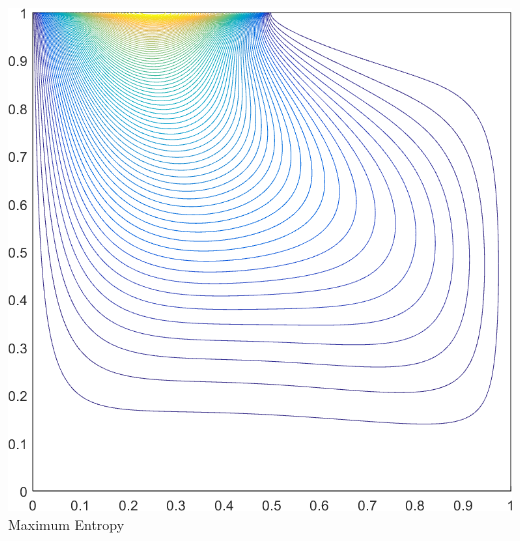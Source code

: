 \documentclass[compress,10pt]{beamer}
\begin{document}
\begin{frame}[t]
{\begin{columns}
{}\includegraphics[width=0.85\columnwidth]{images/deg_square_MAXENT2_contour_b9.png} \\
Maximum Entropy
\end{columns}
}
\end{frame}
\end{document}
